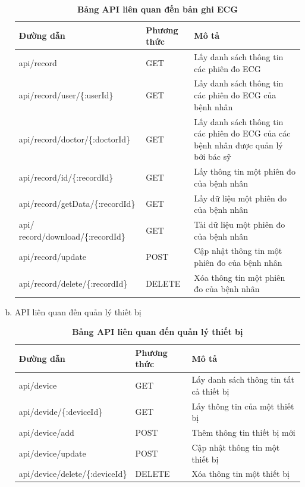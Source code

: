 \begin{enumerate}[a)]
\begin{table}[H]
  \centering
  \caption{\bfseries \fontsize{12pt}{0pt}\selectfont Bảng API liên quan đến bản ghi ECG}
  \begin{tabularx}{0.9\textwidth}{
  | >{\raggedright\arraybackslash}X
  | >{\raggedright\arraybackslash}m{2cm}
  | >{\raggedright\arraybackslash}X|
  }
  \hline
  \bfseries Đường dẫn    &\bfseries Phương thức    &\bfseries Mô tả\\ \hline
 api/record   &   GET  & Lấy danh sách thông tin các phiên đo ECG \\ \hline
 api/record/user/\{:userId\}   &    GET    & Lấy danh sách thông tin các phiên đo ECG của bệnh nhân \\ \hline
 api/record/doctor/\{:doctorId\} &   GET     & Lấy danh sách thông tin các phiên đo ECG của các bệnh nhân được quản lý bởi bác sỹ \\ \hline
 api/record/id/\{:recordId\}  &     GET   & Lấy thông tin một phiên đo của bệnh nhân \\ \hline
 api/record/getData/\{:recordId\}  &     GET   & Lấy dữ liệu một phiên đo của bệnh nhân \\ \hline
 api/ record/download/\{:recordId\}  &     GET   & Tải dữ liệu một phiên đo của bệnh nhân \\ \hline
 api/record/update  &     POST   & Cập nhật thông tin một phiên đo của bệnh nhân \\ \hline
 api/record/delete/\{:recordId\}  &     DELETE   & Xóa thông tin một phiên đo của bệnh nhân \\ \hline

  \end{tabularx}
  \label{table_api_ecg}
\end{table}

\item API liên quan đến quản lý thiết bị


\begin{table}[H]
  \centering
  \caption{\bfseries \fontsize{12pt}{0pt}\selectfont Bảng API liên quan đến quản lý thiết bị}
  \begin{tabularx}{0.9\textwidth}{
  | >{\raggedright\arraybackslash}X
  | >{\raggedright\arraybackslash}m{2cm}
  | >{\raggedright\arraybackslash}X|
  }
  \hline
  \bfseries Đường dẫn    &\bfseries Phương thức    &\bfseries Mô tả\\ \hline
 api/device   &   GET  & Lấy danh sách thông tin tất cả thiết bị \\ \hline
 api/devide/\{:deviceId\}   &    GET    & Lấy thông tin của một thiết bị \\ \hline
 api/device/add &   POST     & Thêm thông tin thiết bị mới \\ \hline
 api/device/update  &     POST   & Cập nhật thông tin một thiết bị \\ \hline
 api/device/delete/\{:deviceId\}  &     DELETE   & Xóa thông tin một thiết bị \\ \hline



\end{tabularx}
\end{table}
\end{enumerate}
